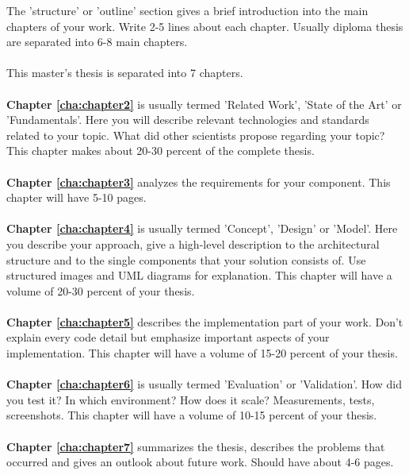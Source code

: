 The 'structure' or 'outline' section gives a brief introduction into the main chapters of your work. Write 2-5 lines about each chapter. Usually diploma thesis are separated into 6-8 main chapters. 
\\
\\
\noindent This master's thesis is separated into 7 chapters.
\\
\\
\textbf{Chapter \ref{cha:chapter2}} is usually termed 'Related Work', 'State of the Art' or 'Fundamentals'. Here you will describe relevant technologies and standards related to your topic. What did other scientists propose regarding your topic? This chapter makes about 20-30 percent of the complete thesis.
\\
\\
\textbf{Chapter \ref{cha:chapter3}} analyzes the requirements for your component. This chapter will have 5-10 pages.
\\
\\
\textbf{Chapter \ref{cha:chapter4}} is usually termed 'Concept', 'Design' or 'Model'. Here you describe your approach, give a high-level description to the architectural structure and to the single components that your solution consists of. Use structured images and UML diagrams for explanation. This chapter will have a volume of 20-30 percent of your thesis.
\\
\\
\textbf{Chapter \ref{cha:chapter5}} describes the implementation part of your work. Don't explain every code detail but emphasize important aspects of your implementation. This chapter will have a volume of 15-20 percent of your thesis.
\\
\\
\textbf{Chapter \ref{cha:chapter6}} is usually termed 'Evaluation' or 'Validation'. How did you test it? In which environment? How does it scale? Measurements, tests, screenshots. This chapter will have a volume of 10-15 percent of your thesis.
\\
\\
\textbf{Chapter \ref{cha:chapter7}} summarizes the thesis, describes the problems that occurred and gives an outlook about future work. Should have about 4-6 pages.